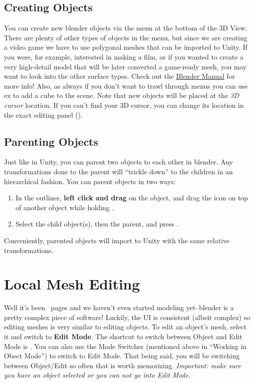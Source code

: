 \documentclass[11pt]{article}
\begin{document}
\subsection{Creating Objects}

You can create new blender objects via the  menu at the bottom of the 3D View.  There
are plenty of other types of objects in the  menu, but since we are creating a video game
we have to use polygonal meshes that can be imported to Unity.  If you were, for example, interested
in making a film, or if you wanted to create a very high-detail model that will be later converted
a game-ready mesh, you may want to look into the other surface types.  Check out the 
\href{https://docs.blender.org/manual/en/latest/modeling/index.html}{Blender Manual} for more info!
Also, as always if you don't want to trawl through menus you can use ex 
to add a cube to the scene.  Note that new objects will be placed at the \textit{3D cursor} location.
If you can't find your 3D cursor, you can change its location in the exact editing panel ().

\subsection{Parenting Objects}

Just like in Unity, you can parent two objects to each other in blender.  Any transformations done
to the parent will ``trickle down'' to the children in an hierarchical fashion.  You can parent
objects in two ways:
\begin{enumerate}
    \item In the outliner, \textbf{left click and drag} on the
          object, and drag the icon on top of another object while holding .
    \item Select the child object(s), then the parent, and press .
\end{enumerate}
Conveniently, parented objects will import to Unity with the same relative transformations.

\section{Local Mesh Editing}

Well it's been \thepage\ pages and we haven't even started modeling yet--blender is a pretty complex
piece of software!  Luckily, the UI is consistent (albeit complex) so editing meshes is very similar
to editing objects.  To edit an object's mesh, select it and switch to \textbf{Edit Mode}.  The
shortcut to switch between Object and Edit Mode is .  You can also use the Mode Switcher
(mentioned above in ``Working in Obect Mode'') to switch to Edit Mode.  That being said, you will
be switching between Object/Edit so often that  is worth memorizing.  \textit{Important:
make sure you have an object selected or you can not go into Edit Mode.}
\end{document}
